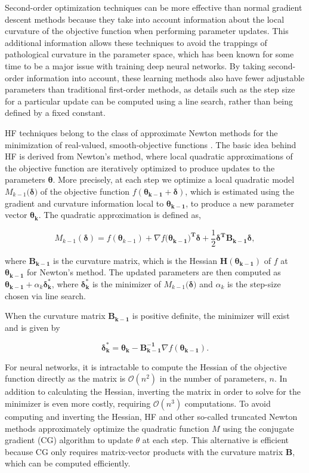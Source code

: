 \documentclass{article}
\begin{document}
Second-order optimization techniques can be more effective than normal gradient
descent methods because they take into account information about the local
curvature of the objective function when performing parameter updates. This
additional information allows these techniques to avoid the trappings of
pathological curvature in the parameter space, which has been known for some
time to be a major issue with training deep neural networks. By taking
second-order information into account, these learning methods also have fewer
adjustable parameters than traditional first-order methods, as details such as
the step size for a particular update can be computed using a line search,
rather than being defined by a fixed constant.

HF techniques belong to the class of approximate Newton methods for the
minimization of real-valued, smooth-objective functions
\cite{martens2012training}. The basic idea behind HF is derived from Newton's
method, where local quadratic approximations of the objective function are
iteratively optimized to produce updates to the parameters $\mathbf{\theta}$.
More precisely, at each step we optimize a local quadratic model
$M_{k-1}(\mathbf{\delta)}$ of the objective function $f(\mathbf{\theta_{k-1}} +
\mathbf{\delta})$, which is estimated using the gradient and curvature
information local to $\mathbf{\theta_{k-1}}$, to produce a new parameter vector
$\mathbf{\theta_k}$. The quadratic approximation is defined as,

\[
  M_{k-1}(\mathbf{\delta}) = f(\mathbf{\theta}_{k-1})
  + \nabla f(\mathbf{\theta_{k-1})^T \delta}
  + \frac{1}{2} \mathbf{\delta^T B_{k-1} \delta},
\]

where $\mathbf{B_{k-1}}$ is the curvature matrix, which is the Hessian
$\mathbf{H(\theta_{k-1})}$ of $f$ at $\mathbf{\theta_{k-1}}$ for Newton's
method. The updated parameters are then computed as $\mathbf{\theta_{k-1}} +
\alpha_k \mathbf{\delta^{*}_{k}}$, where $\mathbf{\delta^{*}_{k}}$ is the
minimizer of $M_{k-1}(\mathbf{\delta)}$ and $\alpha_k$ is the step-size chosen
via line search.

When the curvature matrix $\mathbf{B_{k-1}}$ is positive definite, the
minimizer will exist and is given by

\[
  \mathbf{\delta^{*}_{k}} =
  \mathbf{\theta_k} - \mathbf{B^{-1}_{k-1}} \nabla f(\mathbf{\theta_{k-1}}).
\]


For neural networks, it is intractable to compute the Hessian of the objective
function directly as the matrix is $\mathcal{O}(n^2)$ in the number of
parameters, $n$. In addition to calculating the Hessian, inverting the matrix
in order to solve for the minimizer is even more costly, requiring
$\mathcal{O}(n^3)$ computations. To avoid computing and inverting the Hessian,
HF and other so-called truncated Newton methods approximately optimize the
quadratic function $M$ using the conjugate gradient (CG) algorithm to update
$\theta$ at each step. This alternative is efficient because CG only requires
matrix-vector products with the curvature matrix $\mathbf{B}$, which can be
computed efficiently.
\end{document}
